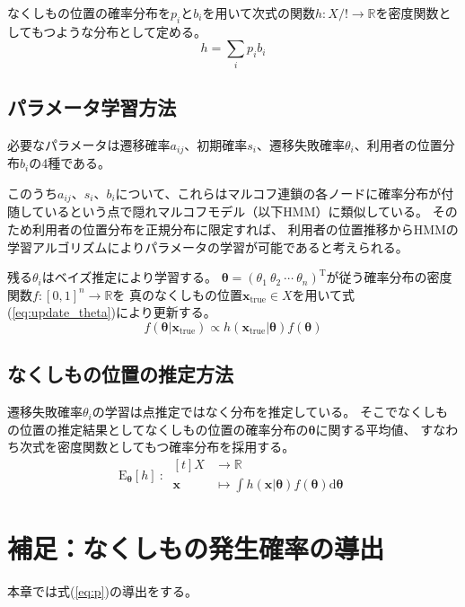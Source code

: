 \documentclass{jarticle}
\numberwithin{equation}{section}
\numberwithin{table}{section}
\numberwithin{figure}{section}
\theoremstyle{plain}
\begin{document}
なくしもの位置の確率分布を$p_i$と$b_i$を用いて次式の関数$ h \! : \! X /! \rightarrow \! \mathbb{R}$を密度関数としてもつような分布として定める。
\begin{equation}
    \label{eq:h}
    h = \sum_{i} {p_i b_i}
\end{equation}


\subsection{パラメータ学習方法}
必要なパラメータは遷移確率$a_{i j}$、初期確率$s_i$、遷移失敗確率$\theta_i$、利用者の位置分布$b_i$の4種である。

このうち$a_{i j}$、$s_i$、$b_i$について、これらはマルコフ連鎖の各ノードに確率分布が付随しているという点で隠れマルコフモデル（以下HMM）に類似している。
そのため利用者の位置分布を正規分布に限定すれば、
利用者の位置推移からHMMの学習アルゴリズムによりパラメータの学習が可能であると考えられる。

残る$\theta_i$はベイズ推定により学習する。
$\bm{\theta} = (\theta_1\ \theta_2\ \cdots\ \theta_n)^\mathrm{T}$が従う確率分布の密度関数$f:[0,1]^n \rightarrow \mathbb{R}$を
真のなくしもの位置$\bm{x}_\mathrm{true} \in X$を用いて式(\ref{eq:update_theta})により更新する。
\begin{equation}
    \label{eq:update_theta}
    f(\bm{\theta} | \bm{x}_\mathrm{true}) \propto h(\bm{x}_\mathrm{true} | \bm{\theta}) f(\bm{\theta})
\end{equation}


\subsection{なくしもの位置の推定方法}
遷移失敗確率$\theta_i$の学習は点推定ではなく分布を推定している。
そこでなくしもの位置の推定結果としてなくしもの位置の確率分布の$\bm{\theta}$に関する平均値、
すなわち次式を密度関数としてもつ確率分布を採用する。
\begin{equation}
    \label{eq:Eh}
    \mathrm{E}_{\bm{\theta}} \left[ h \right]\ :\ 
    \begin{aligned}[t]
        X &\rightarrow \mathbb{R} \\
        \bm{x} &\mapsto \int {h(\bm{x} | \bm{\theta}) f(\bm{\theta}) \mathrm{d} \bm{\theta}}
    \end{aligned}
\end{equation}


\section{補足：なくしもの発生確率の導出}
\label{sec:calc_p}
本章では式(\ref{eq:p})の導出をする。
\end{document}
